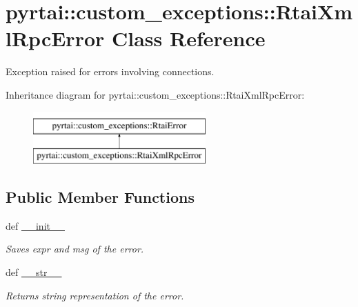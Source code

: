 \hypertarget{classpyrtai_1_1custom__exceptions_1_1_rtai_xml_rpc_error}{
\section{pyrtai\-:\-:custom\-\_\-exceptions\-:\-:\-Rtai\-Xml\-Rpc\-Error \-Class \-Reference}
\label{classpyrtai_1_1custom__exceptions_1_1_rtai_xml_rpc_error}
}


\-Exception raised for errors involving connections.  


\-Inheritance diagram for pyrtai\-:\-:custom\-\_\-exceptions\-:\-:\-Rtai\-Xml\-Rpc\-Error\-:\begin{figure}[H]
\begin{center}
\leavevmode
\includegraphics[height=2.000000cm]{classpyrtai_1_1custom__exceptions_1_1_rtai_xml_rpc_error}
\end{center}
\end{figure}
\subsection*{\-Public \-Member \-Functions}
\begin{DoxyCompactItemize}
\item 
def \hyperlink{classpyrtai_1_1custom__exceptions_1_1_rtai_xml_rpc_error_af7e7292eb31393297fecb648f4a24dfb}{\-\_\-\-\_\-init\-\_\-\-\_\-}
\begin{DoxyCompactList}\small\item\em \-Saves expr and msg of the error. \end{DoxyCompactList}\item 
def \hyperlink{classpyrtai_1_1custom__exceptions_1_1_rtai_xml_rpc_error_a3c85aadda9365580b03d849e30b6c554}{\-\_\-\-\_\-str\-\_\-\-\_\-}
\begin{DoxyCompactList}\small\item\em \-Returns string representation of the error. \end{DoxyCompactList}\end{DoxyCompactItemize}
